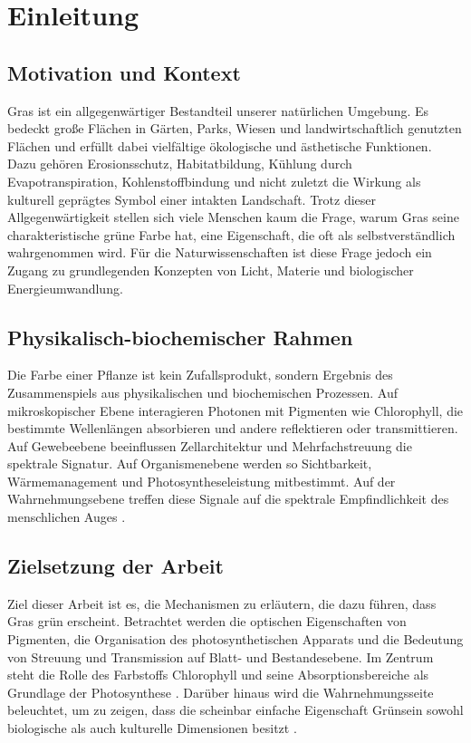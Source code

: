 \chapter{Einleitung}

\section{Motivation und Kontext}
Gras ist ein allgegenwärtiger Bestandteil unserer natürlichen Umgebung. Es bedeckt große Flächen in Gärten, Parks, Wiesen und landwirtschaftlich genutzten Flächen und erfüllt dabei vielfältige ökologische und ästhetische Funktionen. Dazu gehören Erosionsschutz, Habitatbildung, Kühlung durch Evapotranspiration, Kohlenstoffbindung und nicht zuletzt die Wirkung als kulturell geprägtes Symbol einer intakten Landschaft. Trotz dieser Allgegenwärtigkeit stellen sich viele Menschen kaum die Frage, warum Gras seine charakteristische grüne Farbe hat, eine Eigenschaft, die oft als selbstverständlich wahrgenommen wird. Für die Naturwissenschaften ist diese Frage jedoch ein Zugang zu grundlegenden Konzepten von Licht, Materie und biologischer Energieumwandlung.

\section{Physikalisch-biochemischer Rahmen}
Die Farbe einer Pflanze ist kein Zufallsprodukt, sondern Ergebnis des Zusammenspiels aus physikalischen und biochemischen Prozessen. Auf mikroskopischer Ebene interagieren Photonen mit Pigmenten wie Chlorophyll, die bestimmte Wellenlängen absorbieren und andere reflektieren oder transmittieren. Auf Gewebeebene beeinflussen Zellarchitektur und Mehrfachstreuung die spektrale Signatur. Auf Organismenebene werden so Sichtbarkeit, Wärmemanagement und Photosyntheseleistung mitbestimmt. Auf der Wahrnehmungsebene treffen diese Signale auf die spektrale Empfindlichkeit des menschlichen Auges \parencite{meyer2018photosynthese, renoult2017evolution}.

\section{Zielsetzung der Arbeit}
Ziel dieser Arbeit ist es, die Mechanismen zu erläutern, die dazu führen, dass Gras grün erscheint. Betrachtet werden die optischen Eigenschaften von Pigmenten, die Organisation des photosynthetischen Apparats und die Bedeutung von Streuung und Transmission auf Blatt- und Bestandesebene. Im Zentrum steht die Rolle des Farbstoffs Chlorophyll und seine Absorptionsbereiche als Grundlage der Photosynthese \parencite{schmidt2015chlorophyll, meyer2018photosynthese}. Darüber hinaus wird die Wahrnehmungsseite beleuchtet, um zu zeigen, dass die scheinbar einfache Eigenschaft Grünsein sowohl biologische als auch kulturelle Dimensionen besitzt \parencite{renoult2017evolution}.

